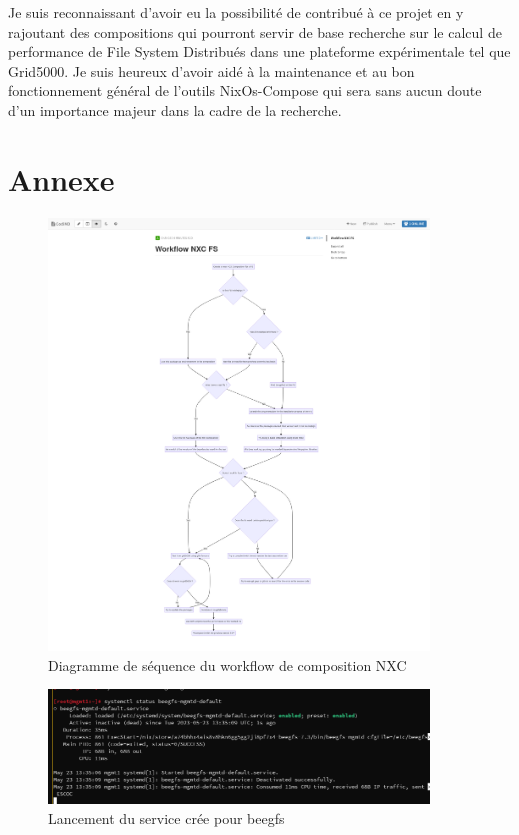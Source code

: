 \documentclass[a4paper,french,12pt, titlepage]{article}
\begin{document}
Je suis reconnaissant d'avoir eu la possibilité de contribué à ce projet
en y rajoutant des compositions qui pourront servir de base recherche
sur le calcul de performance de File System Distribués dans une
plateforme expérimentale tel que Grid5000. Je suis heureux d'avoir aidé
à la maintenance et au bon fonctionnement général de l'outils
NixOs-Compose qui sera sans aucun doute d'un importance majeur dans la
cadre de la recherche.\newline

\newpage

\hypertarget{annexe}{%
\section{Annexe}\label{annexe}}

\printbibliography

\printglossaries

\newpage

\begin{figure}
\centering
\includegraphics[width=0.9\textwidth,height=0.9\textheight,keepaspectratio]{annexe/workflowpre.png}
\caption{Diagramme de séquence du workflow de composition NXC}
\end{figure}

\begin{figure}
\centering
\includegraphics[width=0.9\textwidth,height=0.9\textheight,keepaspectratio]{annexe/beegfs_service.png}
\caption{Lancement du service crée pour beegfs}
\end{figure}
\end{document}
